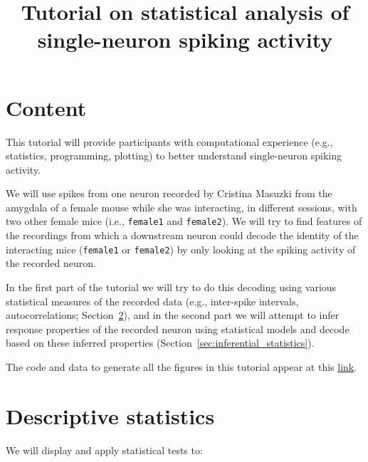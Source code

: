 \documentclass[10pt]{article}
\title{Tutorial on statistical analysis of single-neuron spiking activity}
\author{}
\begin{document}
\maketitle

\section{Content}

This tutorial will provide participants with computational experience
(e.g., statistics, programming, plotting) to better understand single-neuron
spiking activity.

We will use spikes from one neuron recorded by Cristina Masuzki from the
amygdala of a female mouse while she was interacting, in different sessions,
with two other female mice (i.e., \texttt{female1} and \texttt{female2}). We will try to find
features of the recordings from which a downstream neuron could decode the
identity of the interacting mice (\texttt{female1} or \texttt{female2}) by only looking at the
spiking activity of the recorded neuron.

In the first part of the tutorial we will try to do this decoding using various
statistical measures of the recorded data (e.g., inter-spike intervals,
autocorrelations; Section~\ref{sec:descriptive_statistics}), and in the second
part we will attempt to infer response properties of the recorded neuron using
statistical models and decode based on these inferred properties
(Section~\ref{sec:inferential_statistics}).

The code and data to generate all the figures in this tutorial appear at this
\href{https://github.com/joacorapela/singleNeuronSpikesAnalysisTutorial}{link}.

\section{Descriptive statistics}
\label{sec:descriptive_statistics}

We will display and apply statistical tests to:
\end{document}
